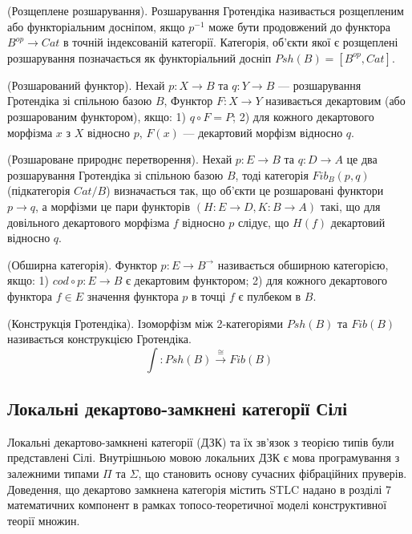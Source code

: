 \begin{definition} (Розщеплене розшарування). Розшарування Гротендіка називається
розщепленим або функторіальним досніпом, якщо $p^{-1}$ може бути продовжений до
функтора $B^{op}\rightarrow Cat$ в точній індексованій категорії.
Категорія, об'єкти якої є розщеплені розшарування позначається як функторіальний досніп $Psh(B) = [B^{op},Cat]$.
\end{definition}

\begin{definition} (Розшарований функтор).
Нехай $p : X \rightarrow B$ та $q : Y \rightarrow B$ --- розшарування Гротендіка зі спільною базою $B$,
Функтор $F : X \rightarrow Y$ називається декартовим (або розшарованим функтором), якщо:
1) $q\circ F  = P$;
2) для кожного декартового морфізма $x$ з $X$ відносно $p$, $F(x)$ --- декартовий морфізм відносно $q$.
\end{definition}

\begin{definition} (Розшароване природнє перетворення).
Нехай $p : E \rightarrow B$ та $q : D \rightarrow A$ це два розшарування Гротендіка зі спільною базою $B$,
тоді категорія $Fib_B(p,q)$ (підкатегорія $Cat/B$) визначається так, що об'єкти це розшаровані функтори $p \rightarrow q$, а морфізми це пари функторів
$(H : E \rightarrow D, K : B \rightarrow A)$ такі, що для довільного декартового морфізма $f$ відносно $p$ слідує, що $H(f)$ декартовий відносно $q$.
\end{definition}

\begin{definition} (Обширна категорія). Функтор $p : E \rightarrow B^\rightarrow$ називається обширною категорією, якщо:
1) $cod \circ p : E \rightarrow B$ є декартовим функтором;
2) для кожного декартового функтора $f \in E$ значення функтора $p$ в точці $f$ є пулбеком в $B$.
\end{definition}

\begin{definition} (Конструкція Гротендіка). Ізоморфізм між 2-категоріями $Psh(B)$ та $Fib(B)$
називається конструкцією Гротендіка.
$$
\int : Psh(B) \xrightarrow{\cong} Fib(B)
$$
\end{definition}

\newpage
\subsection{Локальні декартово-замкнені категорії Сілі}
Локальні декартово-замкнені категорії (ДЗК) та їх зв'язок з теорією типів були представлені Сілі\cite{Seely84}.
Внутрішньою мовою локальних ДЗК є мова програмування з залежними типами $\Pi$ та $\Sigma$, що становить основу сучасних фібраційних пруверів.
Доведення, що декартово замкнена категорія містить STLC надано в розділі 7 математичних компонент
в рамках топосо-теоретичної моделі конструктивної теорії множин.

